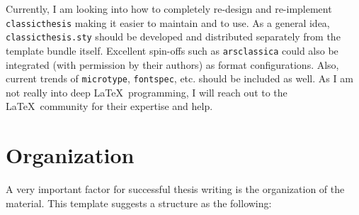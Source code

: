 Currently, I am looking into how to completely re-design and 
re-implement \texttt{classicthesis} making it easier to maintain and 
to use. As a general idea, \texttt{classicthesis.sty} should be 
developed and distributed separately from the template bundle itself. 
Excellent spin-offs such as \texttt{arsclassica} could also be 
integrated (with permission by their authors) as format configurations. 
Also, current trends of \texttt{microtype}, \texttt{fontspec}, etc. 
should be included as well. As I am not really into deep 
\LaTeX\ programming, 
I will reach out to the \LaTeX\ community for their expertise and help.


\section{Organization}
A very important factor for successful thesis writing is the
organization of the material. This template suggests a structure as
the following:
